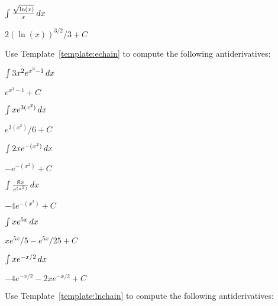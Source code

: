 \begin{exercises}
\begin{multicols}{2}
\begin{exercise}
$\int \frac{\sqrt{\ln(x)}}{x} \, d x$ 
\begin{answer}
$2(\ln(x))^{3/2}/3 +C$
\end{answer}
\end{exercise}
\end{multicols}

\noindent Use Template~\ref{template:echain} to compute the following
antiderivatives:

\begin{multicols}{2}
\begin{exercise}
$\int 3x^2 e^{x^3-1} \, d x$ 
\begin{answer}
$e^{x^3-1} + C$
\end{answer}
\end{exercise}

\begin{exercise}
$\int x e^{3(x^2)} \, d x$ 
\begin{answer}
$e^{3(x^2)}/6+C$
\end{answer}
\end{exercise}

\begin{exercise}
$\int 2x e^{-(x^2)} \, d x$ 
\begin{answer}
$-e^{-(x^2)} + C$
\end{answer}
\end{exercise}

\columnbreak

\begin{exercise}
$\int \frac{8x}{e^{(x^2)}}\, d x$ 
\begin{answer}
$-4e^{-(x^2)} +C$
\end{answer}
\end{exercise}

\begin{exercise}
$\int x e^{5x} \, d x$ 
\begin{answer}
$xe^{5x}/5 - e^{5x}/25 + C$
\end{answer}
\end{exercise}

\begin{exercise}
$\int x e^{-x/2} \, d x$ 
\begin{answer}
$-4e^{-x/2}  - 2xe^{-x/2} +C$
\end{answer}
\end{exercise}
\end{multicols}

\noindent Use Template~\ref{template:lnchain} to compute the following
antiderivatives:


\end{exercises}
